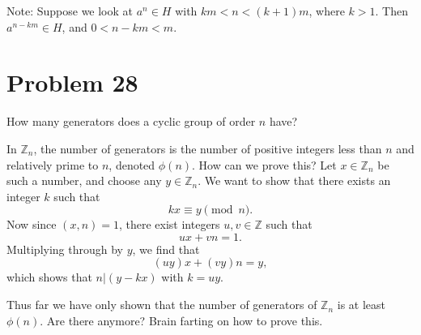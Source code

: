\documentclass[12pt]{article}
\newcommand{\Z}{\mathbb{Z}}
\begin{document}
Note: Suppose we look at $a^n\in H$ with $km < n < (k+1)m$, where $k>1$.  Then $a^{n-km}\in H$,
and $0 < n-km < m$.

\section*{Problem 28}

How many generators does a cyclic group of order $n$ have?

In $\Z_n$, the number of generators is the number of positive integers less than $n$ and
relatively prime to $n$, denoted $\phi(n)$.  How can we prove this?
Let $x\in\Z_n$ be such a number, and choose any $y\in\Z_n$.  We want to show that there exists an integer $k$
such that
\begin{equation*}
kx\equiv y\pmod{n}.
\end{equation*}
Now since $(x,n)=1$, there exist integers $u,v\in\Z$ such that
\begin{equation*}
ux+ vn = 1.
\end{equation*}
Multiplying through by $y$, we find that
\begin{equation*}
(uy)x + (vy)n = y,
\end{equation*}
which shows that $n|(y-kx)$ with $k=uy$.

Thus far we have only shown that the number of generators of $\Z_n$ is at least $\phi(n)$.
Are there anymore?  Brain farting on how to prove this.
\end{document}
